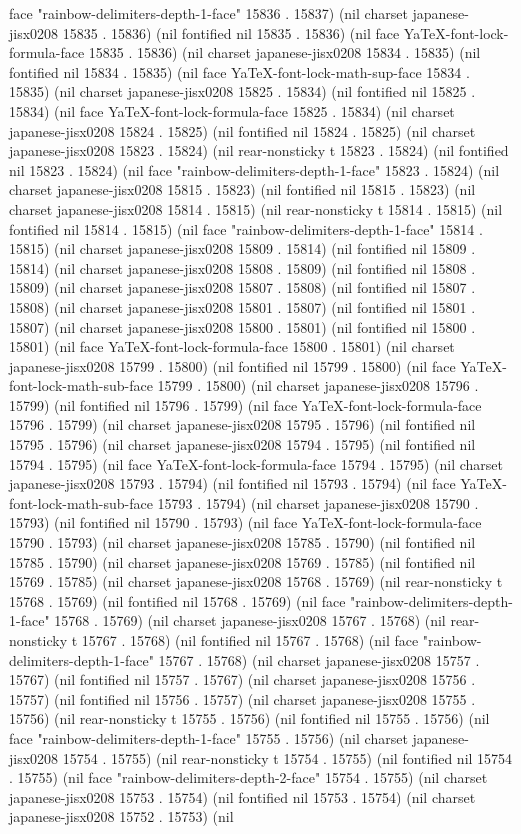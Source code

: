 face "rainbow-delimiters-depth-1-face" 15836 . 15837) (nil charset japanese-jisx0208 15835 . 15836) (nil fontified nil 15835 . 15836) (nil face YaTeX-font-lock-formula-face 15835 . 15836) (nil charset japanese-jisx0208 15834 . 15835) (nil fontified nil 15834 . 15835) (nil face YaTeX-font-lock-math-sup-face 15834 . 15835) (nil charset japanese-jisx0208 15825 . 15834) (nil fontified nil 15825 . 15834) (nil face YaTeX-font-lock-formula-face 15825 . 15834) (nil charset japanese-jisx0208 15824 . 15825) (nil fontified nil 15824 . 15825) (nil charset japanese-jisx0208 15823 . 15824) (nil rear-nonsticky t 15823 . 15824) (nil fontified nil 15823 . 15824) (nil face "rainbow-delimiters-depth-1-face" 15823 . 15824) (nil charset japanese-jisx0208 15815 . 15823) (nil fontified nil 15815 . 15823) (nil charset japanese-jisx0208 15814 . 15815) (nil rear-nonsticky t 15814 . 15815) (nil fontified nil 15814 . 15815) (nil face "rainbow-delimiters-depth-1-face" 15814 . 15815) (nil charset japanese-jisx0208 15809 . 15814) (nil fontified nil 15809 . 15814) (nil charset japanese-jisx0208 15808 . 15809) (nil fontified nil 15808 . 15809) (nil charset japanese-jisx0208 15807 . 15808) (nil fontified nil 15807 . 15808) (nil charset japanese-jisx0208 15801 . 15807) (nil fontified nil 15801 . 15807) (nil charset japanese-jisx0208 15800 . 15801) (nil fontified nil 15800 . 15801) (nil face YaTeX-font-lock-formula-face 15800 . 15801) (nil charset japanese-jisx0208 15799 . 15800) (nil fontified nil 15799 . 15800) (nil face YaTeX-font-lock-math-sub-face 15799 . 15800) (nil charset japanese-jisx0208 15796 . 15799) (nil fontified nil 15796 . 15799) (nil face YaTeX-font-lock-formula-face 15796 . 15799) (nil charset japanese-jisx0208 15795 . 15796) (nil fontified nil 15795 . 15796) (nil charset japanese-jisx0208 15794 . 15795) (nil fontified nil 15794 . 15795) (nil face YaTeX-font-lock-formula-face 15794 . 15795) (nil charset japanese-jisx0208 15793 . 15794) (nil fontified nil 15793 . 15794) (nil face YaTeX-font-lock-math-sub-face 15793 . 15794) (nil charset japanese-jisx0208 15790 . 15793) (nil fontified nil 15790 . 15793) (nil face YaTeX-font-lock-formula-face 15790 . 15793) (nil charset japanese-jisx0208 15785 . 15790) (nil fontified nil 15785 . 15790) (nil charset japanese-jisx0208 15769 . 15785) (nil fontified nil 15769 . 15785) (nil charset japanese-jisx0208 15768 . 15769) (nil rear-nonsticky t 15768 . 15769) (nil fontified nil 15768 . 15769) (nil face "rainbow-delimiters-depth-1-face" 15768 . 15769) (nil charset japanese-jisx0208 15767 . 15768) (nil rear-nonsticky t 15767 . 15768) (nil fontified nil 15767 . 15768) (nil face "rainbow-delimiters-depth-1-face" 15767 . 15768) (nil charset japanese-jisx0208 15757 . 15767) (nil fontified nil 15757 . 15767) (nil charset japanese-jisx0208 15756 . 15757) (nil fontified nil 15756 . 15757) (nil charset japanese-jisx0208 15755 . 15756) (nil rear-nonsticky t 15755 . 15756) (nil fontified nil 15755 . 15756) (nil face "rainbow-delimiters-depth-1-face" 15755 . 15756) (nil charset japanese-jisx0208 15754 . 15755) (nil rear-nonsticky t 15754 . 15755) (nil fontified nil 15754 . 15755) (nil face "rainbow-delimiters-depth-2-face" 15754 . 15755) (nil charset japanese-jisx0208 15753 . 15754) (nil fontified nil 15753 . 15754) (nil charset japanese-jisx0208 15752 . 15753) (nil 